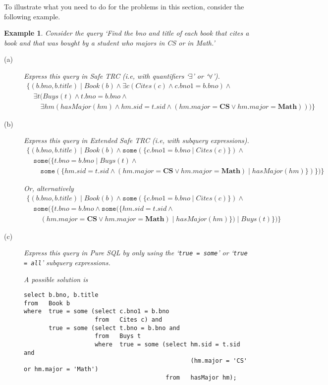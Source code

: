 \documentclass[11pt]{article}
\newtheorem{example}{Example}
\begin{document}
To illustrate what you need to do for the problems in this section, consider the following example.
\begin{example}
\label{queriesWithSubexpressions}
Consider the query `\emph{Find the bno and title of each book that cites a book and that was bought by a student who majors in CS or in Math}.'

\begin{description}
\item[(a)] Express this query in Safe TRC (i.e, with quantifiers `$\exists$' or `$\forall$').
{\small
\[
\begin{array}{l}
\{(b.bno,b.title)\mid Book(b)\land \exists c (Cites(c) \land c.bno1 = b.bno) \land \\
\quad \exists t(Buys(t)\land t.bno = b.bno\land \\
\quad\quad \exists hm(hasMajor(hm)\land hm.sid = t.sid \land 
                                               (hm.major = \mathbf{CS} \lor hm.major = \mathbf{Math})))\}
\end{array}
\]
}
\item[(b)] Express this query in Extended Safe TRC (i.e, with subquery expressions).
{\small
\[
\begin{array}{l}
\{(b.bno,b.title)\mid Book(b)\land \mathtt{some}(\{c.bno1 = b.bno \mid Cites(c)\}) \land \\
\quad \mathtt{some}(\{t.bno = b.bno\mid Buys(t)\land \\
\quad\quad \mathtt{some}(\{hm.sid = t.sid \land (hm.major = \mathbf{CS} \lor hm.major = \mathbf{Math})\mid hasMajor(hm)\})\})\}
\end{array}
\]
}

Or, alternatively
{\small
\[
\begin{array}{l}
\{(b.bno,b.title)\mid Book(b)\land \mathtt{some}(\{c.bno1 = b.bno \mid Cites(c)\}) \land \\
\quad \mathtt{some}(\{t.bno = b.bno \land \mathtt{some}(\{hm.sid = t.sid \land \\
\quad\quad (hm.major = \mathbf{CS} \lor hm.major = \mathbf{Math})\mid hasMajor(hm)\}) \mid Buys(t)\})\}
\end{array}
\]
}


\item[(c)] Express this query in Pure SQL by only using the `{\tt true = some}' or `{\tt true = all}' subquery expressions.

A possible solution is
{\footnotesize
\begin{verbatim}
select b.bno, b.title
from   Book b
where  true = some (select c.bno1 = b.bno
                    from   Cites c) and
       true = some (select t.bno = b.bno and
                    from   Buys t
                    where  true = some (select hm.sid = t.sid and 
                                               (hm.major = 'CS' or hm.major = 'Math')
                                        from   hasMajor hm);
\end{verbatim}
}


\end{description}
\end{example}
\end{document}
